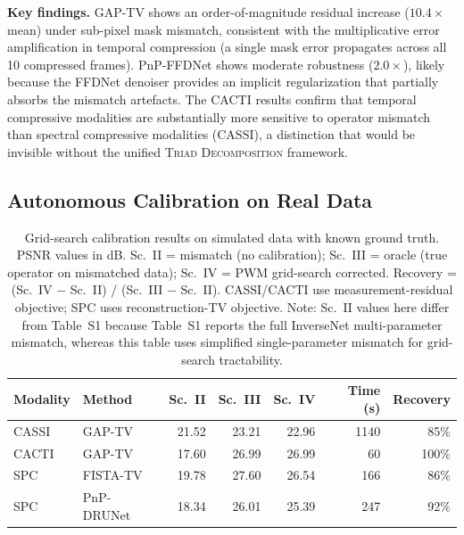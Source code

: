\documentclass[11pt]{article}
\begin{document}
\noindent\textbf{Key findings.}
GAP-TV shows an order-of-magnitude residual increase ($10.4\times$ mean)
under sub-pixel mask mismatch, consistent with the multiplicative error
amplification in temporal compression (a single mask error propagates
across all 10 compressed frames).  PnP-FFDNet shows moderate robustness
($2.0\times$), likely because the FFDNet denoiser provides an implicit
regularization that partially absorbs the mismatch artefacts.  The CACTI
results confirm that temporal compressive modalities are substantially
more sensitive to operator mismatch than spectral compressive modalities
(CASSI), a distinction that would be invisible without the unified
\textsc{Triad Decomposition} framework.


\subsection{Autonomous Calibration on Real Data}

\begin{table}[htbp]
\centering
\caption{Grid-search calibration results on
simulated data with known ground truth.  PSNR values in dB.
Sc.~II = mismatch (no calibration); Sc.~III = oracle (true operator on mismatched data);
Sc.~IV = PWM grid-search corrected.
Recovery = (Sc.~IV $-$ Sc.~II) / (Sc.~III $-$ Sc.~II).
CASSI/CACTI use measurement-residual objective; SPC uses
reconstruction-TV objective.  Note: Sc.~II values here differ from Table~S1 because Table~S1 reports the full InverseNet multi-parameter mismatch, whereas this table uses simplified single-parameter mismatch for grid-search tractability.}
\label{tab:scenario_iv}
\begin{tabular}{l l r r r r r}
\toprule
\textbf{Modality} & \textbf{Method} &
  \textbf{Sc.~II} & \textbf{Sc.~III} & \textbf{Sc.~IV} &
  \textbf{Time (s)} & \textbf{Recovery} \\
\midrule
CASSI  & GAP-TV     & 21.52 & 23.21 & 22.96 & 1140 & 85\% \\
CACTI  & GAP-TV     & 17.60 & 26.99 & 26.99 &   60 & 100\% \\
SPC    & FISTA-TV   & 19.78 & 27.60 & 26.54 &  166 &  86\% \\
SPC    & PnP-DRUNet & 18.34 & 26.01 & 25.39 &  247 &  92\% \\
\bottomrule
\end{tabular}
\end{table}
\end{document}
